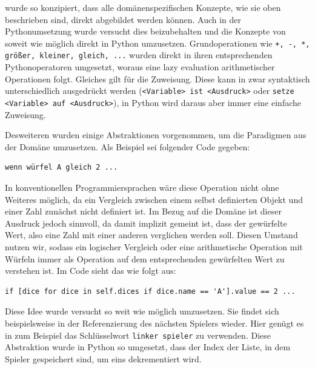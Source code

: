 	\dg wurde so konzipiert, dass alle domänenspezifischen Konzepte, wie sie oben beschrieben sind, direkt abgebildet werden können. Auch in der Pythonumsetzung wurde versucht dies beizubehalten und die Konzepte von \dg soweit wie möglich direkt in Python umzusetzen. Grundoperationen wie \texttt{+, -, *, größer, kleiner, gleich, ...} wurden direkt in ihren entsprechenden Pythonoperatoren umgesetzt, woraus eine lazy evaluation arithmetischer Operationen folgt. Gleiches gilt für die Zuweisung. Diese kann in \dg zwar syntaktisch unterschiedlich ausgedrückt werden (\texttt{<Variable> ist <Ausdruck>} oder \texttt{setze <Variable> auf <Ausdruck>}), in Python wird daraus aber immer eine einfache Zuweisung.

	Desweiteren wurden einige Abstraktionen vorgenommen, um die Paradigmen aus der Domäne umzusetzen. Als Beispiel sei folgender Code gegeben:
\begin{lstlisting}
wenn würfel A gleich 2 ...
\end{lstlisting}
	In konventionellen Programmiersprachen wäre diese Operation nicht ohne Weiteres möglich, da ein Vergleich zwischen einem selbst definierten Objekt und einer Zahl zunächst nicht definiert ist. Im Bezug auf die Domäne ist dieser Ausdruck jedoch sinnvoll, da damit implizit gemeint ist, dass der gewürfelte Wert, also eine Zahl mit einer anderen verglichen werden soll. Diesen Umstand nutzen wir, sodass ein logischer Vergleich oder eine arithmetische Operation mit Würfeln immer als Operation auf dem entsprechenden gewürfelten Wert zu verstehen ist. Im Code sieht das wie folgt aus:
\begin{lstlisting}
if [dice for dice in self.dices if dice.name == 'A'].value == 2 ...
\end{lstlisting}
	Diese Idee wurde versucht so weit wie möglich umzusetzen. Sie findet sich beispielsweise in der Referenzierung des nächsten Spielers wieder. Hier genügt es in \dg zum Beispiel das Schlüsselwort \texttt{linker spieler} zu verwenden. Diese Abstraktion wurde in Python so umgesetzt, dass der Index der Liste, in dem Spieler gespeichert sind, um eins dekrementiert wird.

